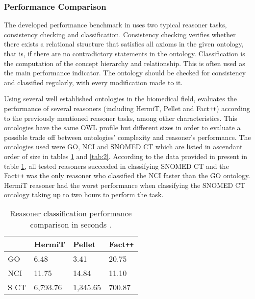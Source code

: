 \subsubsection{Performance Comparison}

The developed performance benchmark in \cite{Dentler2011} uses two typical reasoner tasks, consistency checking and classification. Consistency checking verifies whether there exists a relational structure that satisfies all axioms in the given ontology, that is, if there are no contradictory statements in the ontology. Classification is the computation of the concept hierarchy and relationship. This is often used as the main performance indicator. The ontology should be checked for consistency and classified regularly, with every modification made to it. 

Using several well established ontologies in the biomedical field, \cite{Dentler2011} evaluates the performance of several reasoners (including HermiT, Pellet and Fact\texttt{++}) according to the previously mentioned reasoner tasks, among other characteristics. This ontologies have the same OWL profile but different sizes in order to evaluate a possible trade off between ontologies' complexity and reasoner's performance. The ontologies used were GO, NCI and SNOMED CT which are listed in ascendant order of size in tables \ref{tab:1} and \ref{tab:2}. According to the data provided in \cite{Dentler2011} present in table \ref{tab:1}, all tested reasoners succeeded in classifying SNOMED CT and the Fact\texttt{++} was the only reasoner who classified the NCI faster than the GO ontology. HermiT reasoner had the worst performance when classifying the SNOMED CT ontology taking up to two hours to perform the task.



\begin{table}[]
\centering
\caption{Reasoner classification performance comparison in seconds \cite{Dentler2011}.}
\begin{tabular}{|l|l|l|l|}
\hline
      &  HermiT    &  Pellet     &  Fact\texttt{++}    \\ \hline
GO    &    6.48    &  3.41       &  20.75     \\ \hline
NCI   &   11.75    &  14.84      &  11.10     \\ \hline
S CT  &  6,793.76  &  1,345.65   &  700.87    \\ \hline
\end{tabular}
\label{tab:1}
\end{table}

